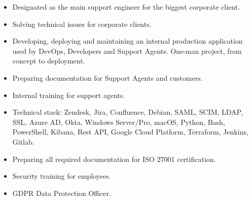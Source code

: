 \documentclass[10pt,a4paper]{altacv}
\begin{document}

\begin{fullwidth}
\makecvheader
\end{fullwidth}

\thispagestyle{empty}
\begin{itemize}
  \item Designated as the main support engineer for the biggest corporate client.
  \item Solving technical issues for corporate clients.
  \item Developing, deploying and maintaining an internal production application used by DevOps, Developers and Support Agents. One-man project, from concept to deployment.
  \item Preparing documentation for Support Agents and customers.
  \item Internal training for support agents.
  \item Technical stack: Zendesk, Jira, Confluence, Debian, SAML, SCIM, LDAP, SSL, Azure AD, Okta, Windows Server/Pro, macOS, Python, Bash, PowerShell, Kibana, Rest API, Google Cloud Platform, Terraform, Jenkins, Gitlab.
  \end{itemize}
\begin{itemize}
  \item Preparing all required documentation for ISO 27001 certification.
  \item Security training for employees.
  \item GDPR Data Protection Officer.
\end{itemize}
\end{document}
